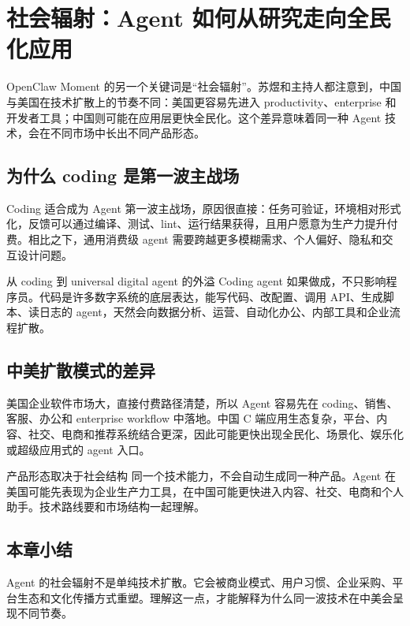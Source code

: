 \section{社会辐射：Agent 如何从研究走向全民化应用}

OpenClaw Moment 的另一个关键词是“社会辐射”。苏煜和主持人都注意到，中国与美国在技术扩散上的节奏不同：美国更容易先进入 productivity、enterprise 和开发者工具；中国则可能在应用层更快全民化。这个差异意味着同一种 Agent 技术，会在不同市场中长出不同产品形态。

\subsection{为什么 coding 是第一波主战场}

Coding 适合成为 Agent 第一波主战场，原因很直接：任务可验证，环境相对形式化，反馈可以通过编译、测试、lint、运行结果获得，且用户愿意为生产力提升付费。相比之下，通用消费级 agent 需要跨越更多模糊需求、个人偏好、隐私和交互设计问题。

\begin{knowledgebox}{从 coding 到 universal digital agent 的外溢}
Coding agent 如果做成，不只影响程序员。代码是许多数字系统的底层表达，能写代码、改配置、调用 API、生成脚本、读日志的 agent，天然会向数据分析、运营、自动化办公、内部工具和企业流程扩散。
\end{knowledgebox}

\subsection{中美扩散模式的差异}

美国企业软件市场大，直接付费路径清楚，所以 Agent 容易先在 coding、销售、客服、办公和 enterprise workflow 中落地。中国 C 端应用生态复杂，平台、内容、社交、电商和推荐系统结合更深，因此可能更快出现全民化、场景化、娱乐化或超级应用式的 agent 入口。

\begin{importantbox}{产品形态取决于社会结构}
同一个技术能力，不会自动生成同一种产品。Agent 在美国可能先表现为企业生产力工具，在中国可能更快进入内容、社交、电商和个人助手。技术路线要和市场结构一起理解。
\end{importantbox}

\subsection{本章小结}

Agent 的社会辐射不是单纯技术扩散。它会被商业模式、用户习惯、企业采购、平台生态和文化传播方式重塑。理解这一点，才能解释为什么同一波技术在中美会呈现不同节奏。


